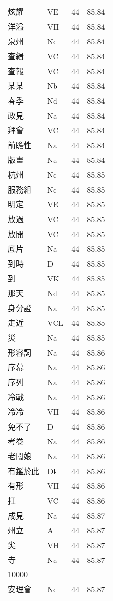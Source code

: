 \documentclass[twocolumn]{book}
\begin{document}
\begin{supertabular}{llrr}
炫耀 & VE & 44 &  85.84\\
洋溢 & VH & 44 &  85.84\\
泉州 & Nc & 44 &  85.84\\
查緝 & VC & 44 &  85.84\\
查報 & VC & 44 &  85.84\\
某某 & Nb & 44 &  85.84\\
春季 & Nd & 44 &  85.84\\
政見 & Na & 44 &  85.84\\
拜會 & VC & 44 &  85.84\\
前瞻性 & Na & 44 &  85.84\\
版畫 & Na & 44 &  85.84\\
杭州 & Nc & 44 &  85.85\\
服務組 & Nc & 44 &  85.85\\
明定 & VE & 44 &  85.85\\
放過 & VC & 44 &  85.85\\
放開 & VC & 44 &  85.85\\
底片 & Na & 44 &  85.85\\
到時 & D & 44 &  85.85\\
到 & VK & 44 &  85.85\\
那天 & Nd & 44 &  85.85\\
身分證 & Na & 44 &  85.85\\
走近 & VCL & 44 &  85.85\\
災 & Na & 44 &  85.85\\
形容詞 & Na & 44 &  85.86\\
序幕 & Na & 44 &  85.86\\
序列 & Na & 44 &  85.86\\
冷戰 & Na & 44 &  85.86\\
冷冷 & VH & 44 &  85.86\\
免不了 & D & 44 &  85.86\\
考卷 & Na & 44 &  85.86\\
老闆娘 & Na & 44 &  85.86\\
有鑑於此 & Dk & 44 &  85.86\\
有形 & VH & 44 &  85.86\\
扛 & VC & 44 &  85.86\\
成見 & Na & 44 &  85.87\\
州立 & A & 44 &  85.87\\
尖 & VH & 44 &  85.87\\
寺 & Na & 44 &  85.87\\
10000\\
安理會 & Nc & 44 &  85.87\\

\end{supertabular}
\end{document}
